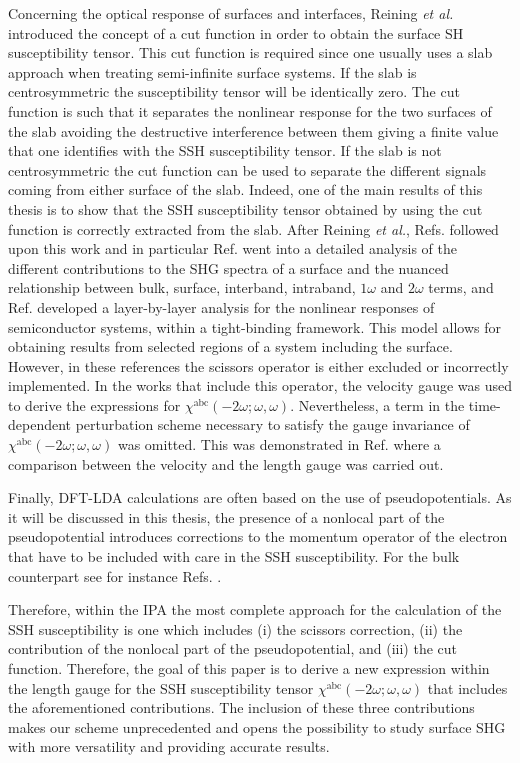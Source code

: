 Concerning the optical response of surfaces and interfaces, Reining \textit{et
al.}\cite{reiningPRB94} introduced the concept of a cut function in order to
obtain the surface SH susceptibility tensor. This cut function is required since
one usually uses a slab approach when treating semi-infinite surface
systems.\cite{reiningPRB94} If the slab is centrosymmetric the susceptibility
tensor will be identically zero. The cut function is such that it separates the
nonlinear response for the two surfaces of the slab avoiding the destructive
interference between them giving a finite value that one identifies with the SSH
susceptibility tensor. If the slab is not centrosymmetric the cut function can
be used to separate the different signals coming from either surface of the
slab. Indeed, one of the main results of this thesis is to show that the SSH
susceptibility tensor obtained by using the cut function is correctly extracted
from the slab. After Reining \textit{et al.},\cite{reiningPRB94} Refs.
\cite{mendozaPRL98,arzatePRB01,mendozaPRB01,mejiaPRB02,sanoPRB02} followed upon
this work and in particular Ref. \cite{arzatePRB01} went into a detailed
analysis of the different contributions to the SHG spectra of a surface and the
nuanced relationship between bulk, surface, interband, intraband, $1\omega$ and
$2\omega$ terms, and Ref. \cite{mejiaRMF04} developed a layer-by-layer analysis
for the nonlinear responses of semiconductor systems, within a tight-binding
framework. This model allows for obtaining results from selected regions of a
system including the surface. However, in these references the scissors operator
is either excluded or incorrectly implemented. In the works that include this
operator,  the velocity gauge was used to derive the expressions for
$\chi^{\mathrm{abc}}(-2\omega;\omega,\omega)$. Nevertheless, a term in the
time-dependent perturbation scheme necessary to satisfy the gauge invariance of
$\chi^{\mathrm{abc}}(-2\omega;\omega,\omega)$  was omitted. This was
demonstrated in Ref. \cite{cabellosPRB09} where a comparison between the
velocity and the length gauge was carried out.

Finally, DFT-LDA calculations are often based on the use of pseudopotentials. As
it will be discussed in this thesis, the presence of a nonlocal part of the
pseudopotential introduces corrections to the momentum operator of the electron
that have to be included with care in the SSH susceptibility. For the bulk
counterpart see for instance Refs. \cite{ismailPRL01,luppiPRB08}.

Therefore, within the IPA the most complete approach for the calculation of the
SSH susceptibility is one which includes (i) the scissors correction, (ii) the
contribution of the nonlocal part of the pseudopotential, and (iii) the cut
function. Therefore, the goal of this paper is to derive a new expression within
the length gauge for the SSH susceptibility tensor
$\chi^{\mathrm{a}\mathrm{b}\mathrm{c}}(-2\omega;\omega,\omega)$ that includes
the aforementioned contributions. The inclusion of these three contributions
makes our scheme unprecedented and opens the possibility to study surface SHG
with more versatility and providing accurate results.


